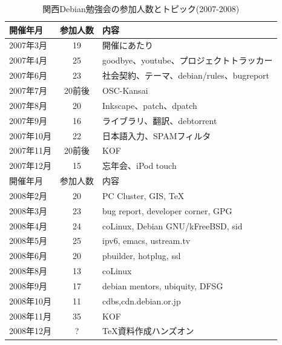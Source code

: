 \documentclass[mingoth,a4paper]{jsarticle}
\begin{document}
\begin{table}
  \begin{minipage}{.5\linewidth}
    \caption{関西Debian勉強会の参加人数とトピック(2007-2008)}
    \begin{center}
      \begin{tabular}{|l|c|p{10em}|}
        \hline
        開催年月   & 参加人数 & 内容 \\
        \hline
        2007年3月  & 19       & 開催にあたり \\
        2007年4月  & 25       & goodbye、youtube、プロジェクトトラッカー\\
        2007年6月  & 23       & 社会契約、テーマ、debian/rules、bugreport\\
        2007年7月  & 20前後   & OSC-Kansai \\
        2007年8月  & 20       & Inkscape、patch、dpatch\\
        2007年9月  & 16       & ライブラリ、翻訳、debtorrent\\
        2007年10月 & 22       & 日本語入力、SPAMフィルタ\\
        2007年11月 & 20前後   & KOF \\
        2007年12月 & 15       & 忘年会、iPod touch\\
        \hline
        \hline
        開催年月   & 参加人数 & 内容 \\
        \hline
        2008年2月  & 20       & PC Cluster, GIS, \TeX \\
        2008年3月  & 23       & bug report, developer corner, GPG \\
        2008年4月  & 24       & coLinux, Debian GNU/kFreeBSD, sid \\
        2008年5月  & 25       & ipv6, emacs, ustream.tv\\
        2008年6月  & 20       & pbuilder, hotplug, ssl\\
        2008年8月  & 13       & coLinux \\
        2008年9月  & 17       & debian mentors, ubiquity, DFSG\\
        2008年10月 & 11       & cdbs,cdn.debian.or.jp \\
        2008年11月 & 35       & KOF \\
        2008年12月 & ?        & TeX資料作成ハンズオン\\
        \hline
      \end{tabular}
    \end{center}
  \end{minipage}
  \pagebreak

\end{table}
\end{document}
